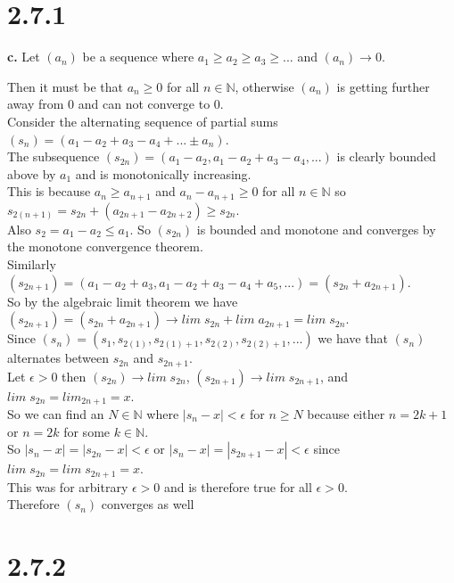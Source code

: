 \documentclass{article}
\begin{document}
\section*{2.7.1}
{\Large \textbf{c.}} Let $(a_n)$ be a sequence where $a_1\geq a_2\geq a_3\geq ...$ and $(a_n)\rightarrow 0$.
\begin{center}
    \doublespacing
    Then it must be that $a_n\geq 0$ for all $n\in\mathbb{N}$, otherwise $(a_n)$ is getting further away from 0 and can not converge to 0.
    \\Consider the alternating sequence of partial sums $(s_n) = (a_1 - a_2 + a_3 - a_4 + ...\pm a_n)$.
    \\The subsequence $(s_{2n}) = (a_1 - a_2, a_1 - a_2 + a_3 - a_4, ...)$ is clearly bounded above by $a_1$ and is monotonically increasing.
    \\This is because $a_n\geq a_{n+1}$ and $a_n - a_{n+1}\geq 0$ for all $n\in\mathbb{N}$ so $s_{2(n+1)} = s_{2n} + (a_{2n+1} - a_{2n+2})\geq s_{2n}$.
    \\Also $s_2 = a_1 - a_2\leq a_1$. So $(s_{2n})$ is bounded and monotone and converges by the monotone convergence theorem.
    \\Similarly $(s_{2n+1}) = (a_1 - a_2 + a_3, a_1 - a_2 + a_3 - a_4 + a_5, ...) = (s_{2n} + a_{2n+1})$.
    \\So by the algebraic limit theorem we have $(s_{2n+1}) = (s_{2n} + a_{2n+1})\rightarrow lim\; s_{2n} + lim\; a_{2n+1} = lim\; s_{2n}$.
    \\Since $(s_n) = (s_1, s_{2(1)}, s_{2(1) + 1}, s_{2(2)}, s_{2(2) + 1}, ...)$ we have that $(s_n)$ alternates between $s_{2n}$ and $s_{2n+1}$.
    \\Let $\epsilon > 0$ then $(s_{2n})\rightarrow lim\; s_{2n}$, $(s_{2n+1})\rightarrow lim\; s_{2n+1}$, and $lim\; s_{2n} = lim_{2n+1} = x$.
    \\So we can find an $N\in\mathbb{N}$ where $|s_n - x| <\epsilon$ for $n\geq N$ because either $n = 2k + 1$ or $n = 2k$ for some $k\in\mathbb{N}$.
    \\So $|s_n - x| = |s_{2n} - x| <\epsilon$ or $|s_n - x| = |s_{2n+1} - x| <\epsilon$ since $lim\; s_{2n} = lim\; s_{2n+1} = x$.
    \\This was for arbitrary $\epsilon > 0$ and is therefore true for all $\epsilon > 0$.
    \\Therefore $(s_n)$ converges as well \qedsymbol
\end{center}


\newpage
\section*{2.7.2}
\end{document}

